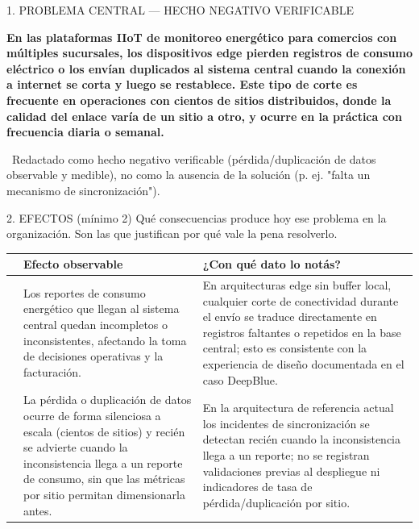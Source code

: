 \documentclass[11pt,a4paper]{article}
\newcommand{\tblhead}{\rowcolor{gris800}}
\begin{document}
\begin{seccion}{\faCrosshairs}{1. PROBLEMA CENTRAL --- HECHO NEGATIVO VERIFICABLE}
\begin{cajacentral}
{\normalsize\bfseries\color{white}En las plataformas IIoT de monitoreo energético para comercios con múltiples sucursales, los dispositivos edge pierden registros de consumo eléctrico o los envían duplicados al sistema central cuando la conexión a internet se corta y luego se restablece. Este tipo de corte es frecuente en operaciones con cientos de sitios distribuidos, donde la calidad del enlace varía de un sitio a otro, y ocurre en la práctica con frecuencia diaria o semanal.}
\end{cajacentral}
\vspace{2pt}
{\scriptsize\color{gris600}\faInfoCircle\ Redactado como hecho negativo verificable (pérdida/duplicación de datos observable y medible), no como la ausencia de la solución (p. ej. "falta un mecanismo de sincronización").}
\end{seccion}

\begin{seccion}{\faListUl}{2. EFECTOS (mínimo 2)}
{\small Qué consecuencias produce hoy ese problema en la organización. Son las que justifican por qué vale la pena resolverlo.}
\vspace{4pt}
\renewcommand{\arraystretch}{1.35}
\begin{tabularx}{\linewidth}{>{\centering\arraybackslash}p{0.6cm} X X}
  \toprule
  \tblhead {\color{white}\bfseries N.\textordmasculine} & {\color{white}\bfseries Efecto observable} & {\color{white}\bfseries ¿Con qué dato lo notás?} \\
  \midrule
  1 & Los reportes de consumo energético que llegan al sistema central quedan incompletos o inconsistentes, afectando la toma de decisiones operativas y la facturación. & En arquitecturas edge sin buffer local, cualquier corte de conectividad durante el envío se traduce directamente en registros faltantes o repetidos en la base central; esto es consistente con la experiencia de diseño documentada en el caso DeepBlue. \\
  2 & La pérdida o duplicación de datos ocurre de forma silenciosa a escala (cientos de sitios) y recién se advierte cuando la inconsistencia llega a un reporte de consumo, sin que las métricas por sitio permitan dimensionarla antes. & En la arquitectura de referencia actual los incidentes de sincronización se detectan recién cuando la inconsistencia llega a un reporte; no se registran validaciones previas al despliegue ni indicadores de tasa de pérdida/duplicación por sitio. \\
  \bottomrule
\end{tabularx}
\end{seccion}
\end{document}
